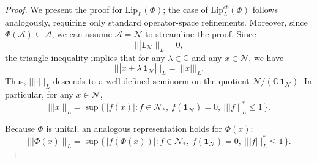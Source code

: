 \documentclass[11pt,reqno]{amsart}
\numberwithin{equation}{section}
\newcommand{\mb}{\mathbb}
\newcommand{\mc}{\mathcal}
\newcommand{\Lip}{\mathrm{Lip}}
\newcommand{\pw}[1]{{\color{blue}[PW: #1]}}
\begin{document}
\begin{proof}
We present the proof for $\Lip_L(\Phi)$; the case of $\Lip^{cb}_L(\Phi)$ follows analogously, requiring only standard operator-space refinements. Moreover, since $\Phi(\mc A) \subseteq \mc A$, we can assume $\mc A = \mc N$ to streamline the proof.
Since 
\[
||| \mathbf{1}_{\mc N} |||_L = 0,
\]
the triangle inequality implies that for any $\lambda\in \mathbb{C}$ and any $x\in \mc N$, we have
\[
|||x + \lambda \, \mathbf{1}_{\mc N} |||_L = |||x|||_L.
\]
Thus, $|||\cdot|||_L$ descends to a well-defined seminorm on the quotient $\mc N/(\mathbb{C}\,\mathbf{1}_{\mc N})$. In particular, for any $x\in \mc N$,
\[
|||x|||_L = \sup\Big\{\, |f(x)| : f\in \mc N_*,\ f(\mathbf{1}_{\mc N}) = 0,\ |||f|||_L^* \le 1 \,\Big\}.
\]

Because $\Phi$ is unital, an analogous representation holds for $\Phi(x)$:
\begin{equation}\label{eqn:dual-phi}
||| \Phi(x) |||_L = \sup\Big\{\, |f(\Phi(x))| : f\in \mc N_*,\ f(\mathbf{1}_{\mc N}) = 0,\ |||f|||_L^* \le 1 \,\Big\}.
\end{equation}


\end{proof}
\end{document}
